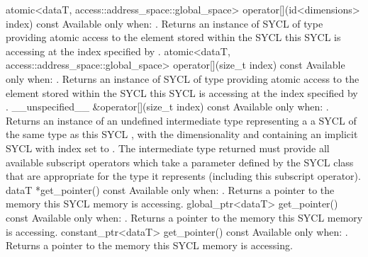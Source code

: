   \addRowTwoL
    { atomic<dataT, access::address_space::global_space> }
    { operator[](id<dimensions> index) const }
    {
      Available only when: .
      \newline
      Returns an instance of SYCL  of type 
      providing atomic access to the element stored within the SYCL  this SYCL  is accessing at the index
      specified by .
    }
  \addRowTwoL
    { atomic<dataT, access::address_space::global_space> }
    { operator[](size_t index) const }
    {
      Available only when: .
      \newline
      Returns an instance of SYCL  of type 
      providing atomic access to the element stored within the SYCL  this SYCL  is accessing at the index
      specified by .
    }
  \addRow
    { \__unspecified__ \&operator[](size_t index) const }
    {
      Available only when: .
      \newline
      Returns an instance of an undefined intermediate type representing a
      a SYCL  of the same type as this SYCL , with the dimensionality  and
      containing an implicit SYCL  with index  set to . The intermediate type returned
      must provide all available subscript operators which take a  parameter defined by the SYCL  class that
      are appropriate for the type it represents (including this subscript
      operator).
    }
  \addRow
    { dataT *get_pointer() const}
    {
      Available only when: .
      Returns a pointer to the memory this SYCL  memory is
      accessing.
    }
  \addRow
    { global_ptr<dataT> get_pointer() const}
    {
      Available only when: .
      Returns a pointer to the memory this SYCL  memory is
      accessing.
    }
  \addRow
    { constant_ptr<dataT> get_pointer() const}
    {
      Available only when: .
      Returns a pointer to the memory this SYCL  memory is
      accessing.
    }
\completeTable

